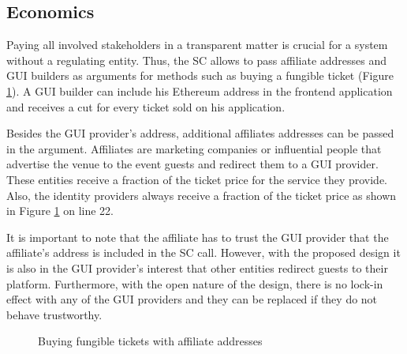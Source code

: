\subsection{Economics}\label{sc:econom}
Paying all involved stakeholders in a transparent matter is crucial for a system without a regulating entity. Thus, the SC allows to pass affiliate addresses and GUI builders as arguments for methods such as buying a fungible ticket (Figure \ref{code:buy-ticket-function}). A GUI builder can include his Ethereum address in the frontend application and receives a cut for every ticket sold on his application. 

Besides the GUI provider's address, additional affiliates addresses can be passed in the argument. Affiliates are marketing companies or influential people that advertise the venue to the event guests and redirect them to a GUI provider. These entities receive a fraction of the ticket price for the service they provide. Also, the identity providers always receive a fraction of the ticket price as shown in Figure \ref{code:buy-ticket-function} on line 22. 

It is important to note that the affiliate has to trust the GUI provider that the affiliate's address is included in the SC call. However, with the proposed design it is also in the GUI provider's interest that other entities redirect guests to their platform. Furthermore, with the open nature of the design, there is no lock-in effect with any of the GUI providers and they can be replaced if they do not behave trustworthy.

\begin{figure}[hbt]
    
    \caption{Buying fungible tickets with affiliate addresses}
    \label{code:buy-ticket-function}
\end{figure}
